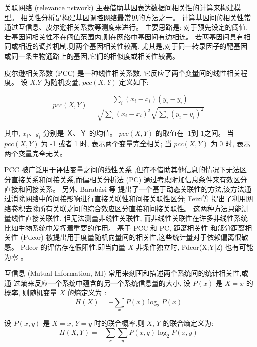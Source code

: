 关联网络 (relevance network) 主要借助基因表达数据间相关性的计算来构建模型。
相关性分析是构建基因调控网络最常见的方法之一。
计算基因间的相关性常通过互信息、皮尔逊相关系数等测度来进行。
主要思路是: 对于预先设定的阈值,若基因间相关性不在阈值范围内,则在网络中基因间有边相连。
若两基因间具有相同或相近的调控机制,则两个基因相关性较高,
尤其是,对于同一转录因子的靶基因或同一条生物通路上的基因,它们的相似度或相关性较高。

皮尔逊相关系数 (PCC) 是一种线性相关系数, 它反应了两个变量间的线性相关程度。
设 $X$,$Y$ 为随机变量, $pcc(X,Y)$ 定义如下:

\begin{equation}
pcc(X,Y) = \frac{{\sum\limits_i {(x_i -\bar x_i )(y_i -\bar y_i )} }}{{\sqrt {\sum\limits_i {(x_i  - \bar x_i )^2 } } \sqrt {\sum\limits_i {(y_i  - \bar y_i )^2 } } }}
\end{equation}

其中, $\bar x_i$、$\bar y_i$ 分别是 Ｘ、Ｙ 的均值。
 $pcc(X,Y)$ 的取值在 -1到 1之间。
当 $pcc(X,Y)$ 为 -1 或者 1 时, 表示两个变量完全相关;
当 $pcc(X,Y)$ 为 0 时, 表示两个变量完全无关。

PCC 被广泛用于评估变量之间的线性关系 \cite{stuart2003gene},但在不借助其他信息的情况下无法区分直接关系和间接关系,而偏相关分析法 (PC) \cite{baba2004partial} 通过考虑附加信息条件来有效区分直接和间接关系。
另外, Barabási 等 \cite{barzel2013network} 提出了一个基于动态关联性的方法,该方法通过消除网络中的间接影响进行直接关联性和间接关联性区分; 
Feizi等 \cite{feizi2013network} 提出了利用网络卷积去除所有关联之间的综合效应区分直接和间接关联性。
这两种方法只能测量线性直接关联性,
但无法测量非线性关联性, 而非线性关联性在许多非线性系统比如生物系统中发挥着重要的作用。
基于 PCC 和 PC, 距离相关性 \cite{szekely2007measuring,kosorok2009brownian} 和部分距离相关性 (Pdcor) \cite{szekely2014partial} 被提出用于度量随机向量间的相关性,这些统计量对于依赖偏离很敏感。
Pdcor 的评估存在假阳性,即当向量 $X$ 非条件独立时, Pdcor(X;Y|Z) 也有可能为零 \cite{szekely2014partial}。

互信息 (Mutual Information, MI) 常用来刻画和描述两个系统间的统计相关性,或通
过熵来反应一个系统中蕴含的另一个系统信息量的大小, 设 $P(x)$ 是 $X=x$ 的概率,
则随机变量 $X$ 的熵定义为 \cite{cover2012elements}:
\begin{equation}
    H(X) = - \sum\limits_x {P(x)\log _2 P(x)} 
\end{equation}

设 $P(x,y)$ 是 $X=x$, $Y=y$ 时的联合概率,则 $X$, $Y$ 的联合熵定义为:
\begin{equation}
    H(X,Y) =  - \sum\limits_x {\sum\limits_y {P(x,y)\log _2 P(x,y)} } 
\end{equation}

